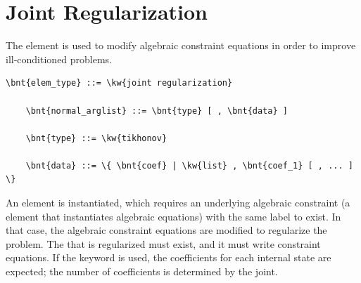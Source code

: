 \section{Joint Regularization}
The  element is used to modify
algebraic constraint equations in order to improve ill-conditioned
problems.

\begin{Verbatim}[commandchars=\\\{\}]
    \bnt{elem_type} ::= \kw{joint regularization}

    \bnt{normal_arglist} ::= \bnt{type} [ , \bnt{data} ]

    \bnt{type} ::= \kw{tikhonov}

    \bnt{data} ::= \{ \bnt{coef} | \kw{list} , \bnt{coef_1} [ , ... ] \}
\end{Verbatim}
An element is instantiated, which requires
an underlying algebraic constraint (a  element
that instantiates algebraic equations) with the same label to exist.
In that case, the algebraic constraint equations are modified
to regularize the problem.
The  that is regularized must exist,
and it must write constraint equations.
If the keyword  is used, the coefficients for each internal state
are expected; the number of coefficients is determined by the joint.

